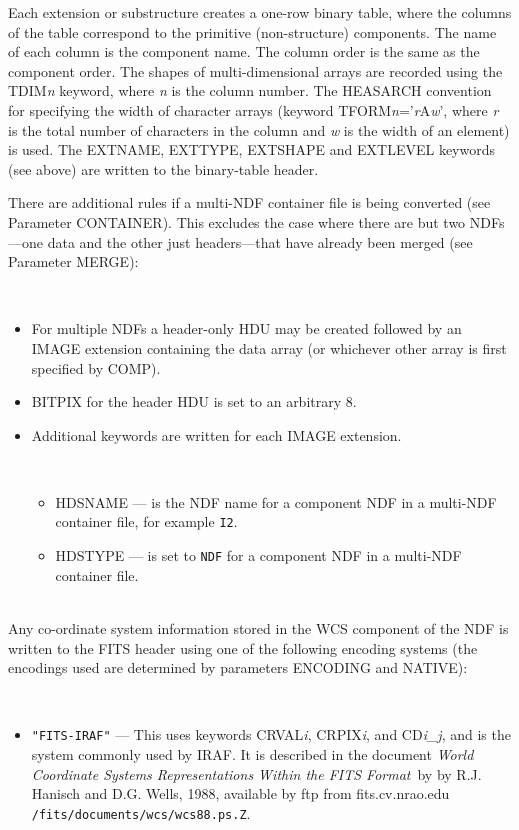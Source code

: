 \documentclass[twoside,11pt]{article}
\newcommand{\latex}[1]{#1}
\newcommand{\sstdiytopic}[2]{\goodbreak \item[{\hspace{-0.35em}#1\hspace{-0.35em}:}] \mbox{} \\[1.3ex] #2}
\newcommand{\ssthitemlist}[1]{
  \latex{
  \mbox{} \\
  \vspace{-3.5ex}
  }
  \begin{itemize}
     #1
  \end{itemize}
}
\newcommand{\sstitem}{\item}
\newcommand{\sstdiytopic}[2]{\\ \item[{#1}:]
      \begin{description}
         #2
      \end{description}
   }
\newcommand{\sstitem}{\item}
\begin{document}
{{{         Each extension or substructure creates a one-row binary table,
         where the columns of the table correspond to the primitive
         (non-structure) components.  The name of each column is the
         component name.  The column order is the same as the component
         order.  The shapes of multi-dimensional arrays are recorded using
         the TDIM\textit{n} keyword, where \textit{n} is the column number.
         The HEASARCH convention for specifying the width of character arrays 
         (keyword TFORM\textit{n}='\textit{r}A\textit{w}', where \textit{r} is
         the total number of characters in the column and \textit{w} is the 
         width of an element) is used.  The EXTNAME,
         EXTTYPE, EXTSHAPE and EXTLEVEL keywords (see above) are written
         to the binary-table header.

      }
      There are additional rules if a multi-NDF container file is being
      converted (see Parameter CONTAINER).  This excludes the case where
      there are but two NDFs---one data and the other just 
      headers---that have already been merged (see Parameter MERGE):
      \ssthitemlist{

         \sstitem
            For multiple NDFs a header-only HDU may be created followed 
            by an IMAGE extension containing the data array (or 
            whichever other array is first specified by COMP).
         \sstitem
            BITPIX for the header HDU is set to an arbitrary 8.
         \sstitem
            Additional keywords are written for each IMAGE extension.
         \ssthitemlist{
            \sstitem
             HDSNAME --- is the NDF name for a component NDF in a multi-NDF
               container file, for example \texttt{I2}.
             \sstitem
             HDSTYPE --- is set to \texttt{NDF} for a component NDF in a 
               multi-NDF container file.
         }
      }      
   }
   \sstdiytopic{
      \label{world_coordinate_systems}World Co-ordinate Systems
   }{
      Any co-ordinate system information stored in the WCS component of the
      NDF is written to the FITS header using one of the following encoding
      systems (the encodings used are determined by parameters ENCODING and 
      NATIVE):
      \ssthitemlist{

         \sstitem 
         \texttt{"FITS-IRAF"} --- This uses keywords CRVAL\textit{i},
         CRPIX\textit{i}, and CD\textit{i\_j}, and is the
         system commonly used by IRAF. It is described in the document
         \textit{World Coordinate Systems Representations Within the FITS
         Format}\ by by R.J. Hanisch and D.G. Wells, 1988, available by ftp from
         fits.cv.nrao.edu \texttt{/fits/documents/wcs/wcs88.ps.Z}.


}}}
\end{document}
